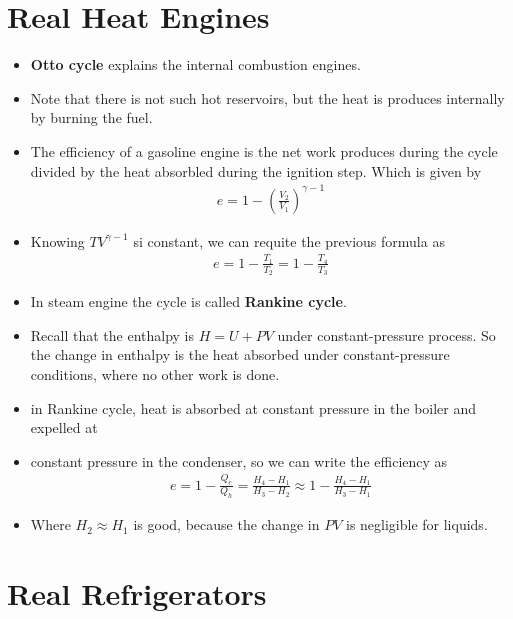 \documentclass{book}
\begin{document}
\section{Real Heat Engines}%
\label{sec:real heat engines}

\begin{itemize}
	\item \textbf{Otto cycle} explains the internal combustion engines.
	\item Note that there is not such hot reservoirs, but the heat is produces internally by burning the fuel.
	\item The efficiency of a gasoline engine is the net work produces during the cycle
	      divided by the heat absorbled during the ignition step. Which is given by
	      \begin{align}
		      e = 1- \left( \frac{V_2}{V_1} \right) ^{\gamma -1}
	      \end{align}
	\item Knowing $ TV^{\gamma -1} $ si constant, we can requite the previous formula as
	      \begin{align}
		      e = 1  - \frac{T_{1}}{T_{2}}= 1- \frac{T_{4}}{T_{3}}
	      \end{align}
	\item In steam engine the cycle is called \textbf{Rankine cycle}.
	\item Recall that the enthalpy is $ H = U + PV $ under constant-pressure process.
	      So the change in enthalpy is the heat absorbed under constant-pressure conditions, where no
	      other work is done.
	\item in Rankine cycle, heat is absorbed at constant pressure in the boiler and expelled at \item constant
	      pressure in the condenser, so we can write the efficiency as
	      \begin{align}
		      e = 1- \frac{Q_{c}}{Q_{h}} = \frac{H_{4} - H_1}{H_3 - H_{2}} \approx 1- \frac{H_4-H_1}{H_3-H_1}
	      \end{align}
				 \item Where $ H_2 \approx H_1 $ is good, because the change in $ PV $ is negligible for liquids.
\end{itemize}

\section{Real Refrigerators}%
\label{sec:real refrigerators}
\end{document}
